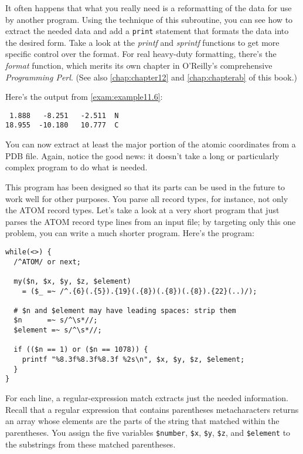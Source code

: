 It often happens that what you really need is a reformatting of the data for use by another program. Using the technique of this subroutine, you can see how to extract the needed data and add a \verb|print| statement that formats the data into the desired form. Take a look at the \textit{printf} and \textit{sprintf} functions to get more specific control over the format. For real heavy-duty formatting, there's the \textit{format} function, which merits its own chapter in O'Reilly's comprehensive \textit{Programming Perl}. (See also \autoref{chap:chapter12} and \autoref{chap:chapterab} of this book.)

Here's the output from \autoref{exam:example11.6}:

\begin{lstlisting}
 1.888   -8.251   -2.511  N
18.955  -10.180   10.777  C
\end{lstlisting}

You can now extract at least the major portion of the atomic coordinates from a PDB file. Again, notice the good news: it doesn't take a long or particularly complex program to do what is needed.

This program has been designed so that its parts can be used in the future to work well for other purposes. You parse all record types, for instance, not only the ATOM record types. Let's take a look at a very short program that just parses the ATOM record type lines from an input file; by targeting only this one problem, you can write a much shorter program. Here's the program: 

\begin{lstlisting}
while(<>) {
  /^ATOM/ or next;

  my($n, $x, $y, $z, $element)
    = ($_ =~ /^.{6}(.{5}).{19}(.{8})(.{8})(.{8}).{22}(..)/);

  # $n and $element may have leading spaces: strip them
  $n      =~ s/^\s*//;
  $element =~ s/^\s*//;

  if (($n == 1) or ($n == 1078)) {
    printf "%8.3f%8.3f%8.3f %2s\n", $x, $y, $z, $element;
  }
}
\end{lstlisting}

For each line, a regular-expression match extracts just the needed information. Recall that a regular expression that contains parentheses metacharacters returns an array whose elements are the parts of the string that matched within the parentheses. You assign the five variables \verb|$number|, \verb|$x|, \verb|$y|, \verb|$z|, and \verb|$element| to the substrings from these matched parentheses.

